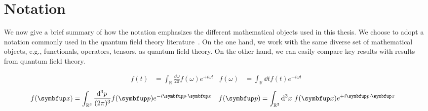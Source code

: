 \section*{Notation}

We now give a brief summary of how the notation emphasizes the different mathematical objects used in this thesis.
We choose to adopt a notation commonly used in the quantum field theory literature~\cite{Weinberg1995,Peskin1995}.
On the one hand, we work with the same diverse set of mathematical objects, e.g., functionals, operators, tensors, as quantum field theory.
On the other hand, we can easily compare key results with results from quantum field theory.

\begin{align*}
	f(t)
	&=
	\int_{\mathbb{R}}\frac{\dd{\omega}}{2\pi}
	f(\omega)
	e^{+i\omega t}
	&
	f(\omega)
	&=
	\int_{\mathbb{R}}\dd{t}
	f(t)
	e^{-i\omega t}
\end{align*}
\begin{align}
	f(\vb{x})
	&=
	\int_{\mathbb{R}^3}\frac{\dd[3]{p}}{(2\pi)^3}
	f(\vb{p})
	e^{-i\vb{p}\vdot\vb{x}}
	&
	f(\vb{p})
	&=
	\int_{\mathbb{R}^3}\dd[3]{x}
	f(\vb{x})
	e^{+i\vb{p}\vdot\vb{x}}
\end{align}

% 


